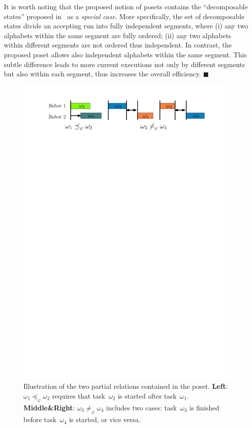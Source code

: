 \begin{remark}\label{remark:compare-poset}
It is worth noting that the proposed notion of posets contains
the ``decomposable states'' proposed in~\cite{schillinger2018simultaneous}
as a \emph{special case}.
More specifically, the set of decomposable states divide an accepting run into
fully independent segments, where
(i) any two alphabets within the same segment are fully ordered;
(ii) any two alphabets within different segments are not ordered thus independent.
In contrast, the proposed poset allows also independent alphabets within the
same segment.
This subtle difference leads to more current executions not only by
different segments but also within each segment,
thus increases the overall efficiency. \hfill $\blacksquare$
\end{remark}
\begin{figure}[t!]
\includegraphics[width=1.0\linewidth]{figures/poset_graph1.pdf}
\centering
\caption{Illustration of the two partial relations
        contained in the poset.
        \textbf{Left}: $\omega_1\preceq_{\varphi} \omega_2$ requires that
task~$\omega_2$ is started after task~$\omega_1$.
\textbf{Middle\&Right}:
$\omega_3\neq_{\varphi} \omega_4$
includes two cases: task~$\omega_3$ is finished
before task~$\omega_4$ is started, or vice versa.}
\label{fig:partial}
\end{figure}

